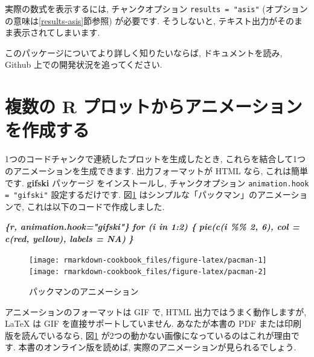 \documentclass[
  11pt,
  lualatex,
  ja=standard]{bxjsreport}
\newenvironment{Shaded}{\begin{snugshade}}{\end{snugshade}}
\newcommand{\InformationTok}[1]{\textcolor[rgb]{0.56,0.35,0.01}{\textbf{\textit{#1}}}}
\begin{document}
実際の数式を表示するには, チャンクオプション \texttt{results = "asis"} (オプションの意味は\ref{results-asis}節参照) が必要です. そうしないと, テキスト出力がそのまま表示されてしまいます.

このパッケージについてより詳しく知りたいならば, ドキュメントを読み, Github 上での開発状況を追ってください.

\hypertarget{animation}{%
\section{複数の R プロットからアニメーションを作成する}\label{animation}}

1つのコードチャンクで連続したプロットを生成したとき, これらを結合して1つのアニメーションを生成できます. 出力フォーマットが HTML なら, これは簡単です. \textbf{gifski} パッケージ \autocite{R-gifski} をインストールし, チャンクオプション \texttt{animation.hook = "gifski"} 設定するだけです. 図\ref{fig:pacman} はシンプルな「パックマン」のアニメーションで, これは以下のコードで作成しました.

\begin{Shaded}
\begin{Highlighting}[]
\InformationTok{\textasciigrave{}\textasciigrave{}\textasciigrave{}\{r, animation.hook="gifski"\}}
\InformationTok{for (i in 1:2) \{}
\InformationTok{  pie(c(i \%\% 2, 6), col = c(\textquotesingle{}red\textquotesingle{}, \textquotesingle{}yellow\textquotesingle{}), labels = NA)}
\InformationTok{\}}
\InformationTok{\textasciigrave{}\textasciigrave{}\textasciigrave{}}
\end{Highlighting}
\end{Shaded}

\begin{figure}

{\centering \texttt{[image: rmarkdown-cookbook\_files/figure-latex/pacman-1]} \texttt{[image: rmarkdown-cookbook\_files/figure-latex/pacman-2]} 

}

\caption{パックマンのアニメーション}\label{fig:pacman}
\end{figure}

アニメーションのフォーマットは GIF で, HTML 出力ではうまく動作しますが, LaTeX は GIF を直接サポートしていません. あなたが本書の PDF または印刷版を読んでいるなら, 図\ref{fig:pacman} が2つの動かない画像になっているのはこれが理由です. 本書のオンライン版を読めば, 実際のアニメーションが見られるでしょう.
\end{document}
